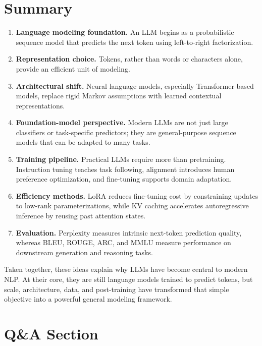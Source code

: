 \documentclass{article}
\begin{document}
\section{Summary}

\begin{enumerate}
    \item \textbf{Language modeling foundation.} An LLM begins as a probabilistic sequence model that predicts the next token using left-to-right factorization.
    \item \textbf{Representation choice.} Tokens, rather than words or characters alone, provide an efficient unit of modeling.
    \item \textbf{Architectural shift.} Neural language models, especially Transformer-based models, replace rigid Markov assumptions with learned contextual representations.
    \item \textbf{Foundation-model perspective.} Modern LLMs are not just large classifiers or task-specific predictors; they are general-purpose sequence models that can be adapted to many tasks.
    \item \textbf{Training pipeline.} Practical LLMs require more than pretraining. Instruction tuning teaches task following, alignment introduces human preference optimization, and fine-tuning supports domain adaptation.
    \item \textbf{Efficiency methods.} LoRA reduces fine-tuning cost by constraining updates to low-rank parameterizations, while KV caching accelerates autoregressive inference by reusing past attention states.
    \item \textbf{Evaluation.} Perplexity measures intrinsic next-token prediction quality, whereas BLEU, ROUGE, ARC, and MMLU measure performance on downstream generation and reasoning tasks.
\end{enumerate}

Taken together, these ideas explain why LLMs have become central to modern NLP. At their core, they are still language models trained to predict tokens, but scale, architecture, data, and post-training have transformed that simple objective into a powerful general modeling framework.

\section{Q\&A Section}
\end{document}
